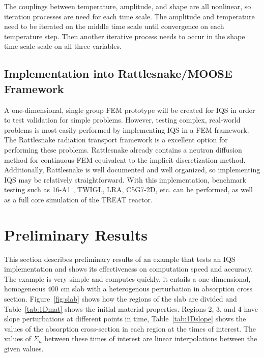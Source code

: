 \documentclass[12pt]{scrartcl}
\newcommand{\fig}[1]{Figure~\ref{#1}}                      %
\newcommand{\tbl}[1]{Table~\ref{#1}}                     %
\begin{document}
The couplings between temperature, amplitude, and shape are all nonlinear, so iteration processes are need for each time scale.  The amplitude and temperature need to be iterated on the middle time scale until convergence on each temperature step.  Then another iterative process needs to occur in the shape time scale scale on all three variables.

\subsection{Implementation into Rattlesnake/MOOSE Framework}

A one-dimensional, single group FEM prototype will be created for IQS in order to test validation for simple problems. However, testing complex, real-world problems is most easily performed by implementing IQS in a FEM framework.  The Rattlesnake radiation transport framework is a excellent option for performing these problems.  Rattlesnake already contains a neutron diffusion method for continuous-FEM equivalent to the implicit discretization method.  Additionally, Rattlesnake is well documented and well organized, so implementing IQS may be relatively straightforward. With this implementation, benchmark testing such as 16-A1 \cite{ANL_BPB}, TWIGL, LRA, C5G7-2D, etc. can be performed, as well as a full core simulation of the TREAT reactor.

\newpage
\section{Preliminary Results}
\label{sect:results}

This section describes preliminary results of an example that tests an IQS implementation and shows its effectiveness on computation speed and accuracy.  The example is very simple and computes quickly, it entails a one dimensional, homogeneous 400 cm slab with a heterogenous perturbation in absorption cross section.  \fig{fig:slab} shows how the regions of the slab are divided and \tbl{tab:1Dmat} shows the initial material properties.  Regions 2, 3, and 4 have slope perturbations at different points in time, \tbl{tab:1Dslope} shows the values of the absorption cross-section in each region at the times of interest.  The values of $\Sigma_a$ between these times of interest are linear interpolations between the given values. \\
\end{document}
